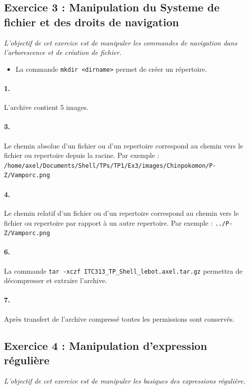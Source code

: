 \subsection{Exercice 3 : Manipulation du Systeme de fichier et des droits de navigation}
\textit{L'objectif de cet exercice est de manipuler les commandes de navigation dans l'arborescence et de création de fichier.}
\begin{itemize}
\item La commande \texttt{mkdir <dirname>} permet de créer un répertoire.
\end{itemize}

\paragraph{1.}
L'archive contient 5 images.

\paragraph{3.}
Le chemin absolue d'un fichier ou d'un repertoire correspond au chemin vers le fichier ou repertoire depuis la racine.
Par exemple : \texttt{/home/axel/Documents/Shell/TPs/TP1/Ex3/images/Chinpokomon/P-Z/Vamporc.png}

\paragraph{4.}
Le chemin relatif d'un fichier ou d'un repertoire correspond au chemin vers le fichier ou repertoire par rapport à un autre repertoire.
Par exemple : \texttt{../P-Z/Vamporc.png}

\paragraph{6.}
La commande \texttt{tar -xczf ITC313_TP_Shell_lebot.axel.tar.gz} permettra de décompresser et extraire l'archive.

\paragraph{7.}
Après transfert de l'archive compressé toutes les permissions sont conservés.

\subsection{Exercice 4 : Manipulation d'expression régulière}
\textit{L'objectif de cet exercice est de manipuler les basiques des expressions régulière.}

